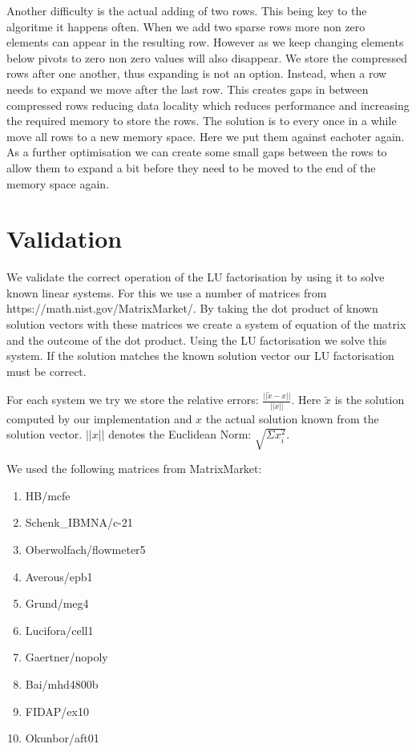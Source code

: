 \documentclass[10pt]{article}
\begin{document}
Another difficulty is the actual adding of two rows. This being key to the algoritme it happens often. When we add two sparse rows more non zero elements can appear in the resulting row. However as we keep changing elements below pivots to zero non zero values will also disappear. We store the compressed rows after one another, thus expanding is not an option. Instead, when a row needs to expand we move after the last row. This creates gaps in between compressed rows reducing data locality which reduces performance and increasing the required memory to store the rows. The solution is to every once in a while move all rows to a new memory space. Here we put them against eachoter again. As a further optimisation we can create some small gaps between the rows to allow them to expand a bit before they need to be moved to the end of the memory space again.

\section{Validation}
\label{sec:val}
We validate the correct operation of the LU factorisation by using it to solve known linear systems. For this we use a number of matrices from https://math.nist.gov/MatrixMarket/. By taking the dot product of known solution vectors with these matrices we create a system of equation of the matrix and the outcome of the dot product. Using the LU factorisation we solve this system. If the solution matches the known solution vector our LU factorisation must be correct. 

For each system we try we store the relative errors: $\frac{||\widetilde{x}-x||}{||x||}$. Here $\widetilde{x}$ is the solution computed by our implementation and $x$ the actual solution known from the solution vector. $||x||$ denotes the Euclidean Norm: $\sqrt{\Sigma x_i^2}$.

We used the following matrices from MatrixMarket:
\begin{multicols}{2}
\begin{enumerate}
    \item HB/mcfe
    \item Schenk\_IBMNA/c-21
    \item Oberwolfach/flowmeter5
    \item Averous/epb1
    \item Grund/meg4
    \item Lucifora/cell1
    \item Gaertner/nopoly
    \item Bai/mhd4800b
    \item FIDAP/ex10
    \item Okunbor/aft01
\end{enumerate}
\end{multicols}
\end{document}
